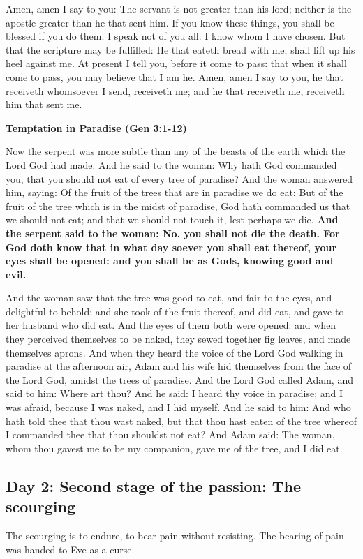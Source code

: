 Amen, amen I say to you: The servant is not greater than his lord; neither is the apostle greater than he that sent him.
If you know these things, you shall be blessed if you do them. I speak not of you all: I know whom I have chosen. But
that the scripture may be fulfilled: He that eateth bread with me, shall lift up his heel against me. At present I tell
you, before it come to pass: that when it shall come to pass, you may believe that I am he. Amen, amen I say to you, he
that receiveth whomsoever I send, receiveth me; and he that receiveth me, receiveth him that sent me.

\textbf{Temptation in Paradise (Gen 3:1-12)}

Now the serpent was more subtle than any of the beasts of the earth which the Lord God had made. And he said to the
woman: Why hath God commanded you, that you should not eat of every tree of paradise? And the woman answered him,
saying: Of the fruit of the trees that are in paradise we do eat: But of the fruit of the tree which is in the midst of
paradise, God hath commanded us that we should not eat; and that we should not touch it, lest perhaps we die.
\textbf{And the serpent said to the woman: No, you shall not die the death. For God doth know that in what day soever
you shall eat thereof, your eyes shall be opened: and you shall be as Gods, knowing good and evil.}

And the woman saw that the tree was good to eat, and fair to the eyes, and delightful to behold: and she took of the
fruit thereof, and did eat, and gave to her husband who did eat. And the eyes of them both were opened: and when they
perceived themselves to be naked, they sewed together fig leaves, and made themselves aprons. And when they heard the
voice of the Lord God walking in paradise at the afternoon air, Adam and his wife hid themselves from the face of the
Lord God, amidst the trees of paradise. And the Lord God called Adam, and said to him: Where art thou? And he said: I
heard thy voice in paradise; and I was afraid, because I was naked, and I hid myself. And he said to him: And who hath
told thee that thou wast naked, but that thou hast eaten of the tree whereof I commanded thee that thou shouldst not
eat? And Adam said: The woman, whom thou gavest me to be my companion, gave me of the tree, and I did eat.

\subsection*{Day 2: Second stage of the passion: The scourging}
The scourging is to endure, to bear pain without resisting. The bearing of pain was handed to Eve as a curse.

